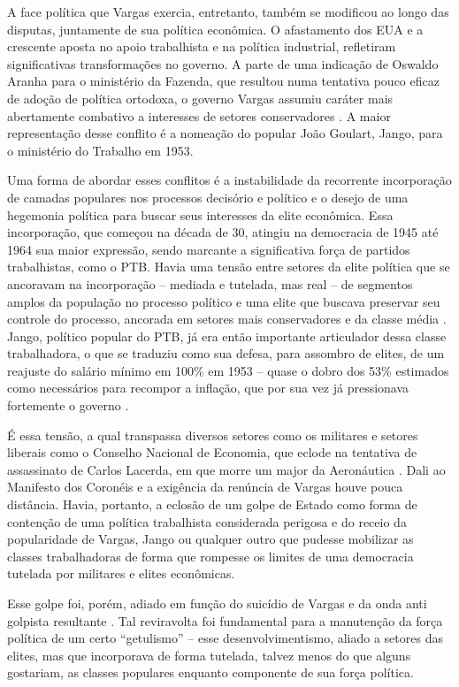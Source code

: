 A face política que Vargas exercia, entretanto, também se modificou ao
longo das disputas, juntamente de sua política econômica. O afastamento
dos EUA e a crescente aposta no apoio trabalhista e na política
industrial, refletiram significativas transformações no governo. A parte
de uma indicação de Oswaldo Aranha para o ministério da Fazenda, que
resultou numa tentativa pouco eficaz de adoção de política ortodoxa, o
governo Vargas assumiu caráter mais abertamente combativo a interesses
de setores conservadores \citep{vianna_o_2025}. A maior representação desse conflito é a
nomeação do popular João Goulart, Jango, para o ministério do Trabalho
em 1953.

Uma forma de abordar esses conflitos é a instabilidade da recorrente
incorporação de camadas populares nos processos decisório e político e o
desejo de uma hegemonia política para buscar seus interesses da elite
econômica. Essa incorporação, que começou na década de 30, atingiu na
democracia de 1945 até 1964 sua maior expressão, sendo marcante a
significativa força de partidos trabalhistas, como o PTB. Havia uma tensão entre
setores da elite política que se ancoravam na incorporação -- mediada e
tutelada, mas real -- de segmentos amplos da população no processo
político e uma elite que buscava preservar seu controle do processo,
ancorada em setores mais conservadores e da classe média \citep[]{weffortPopulismoNaPolitica2003}.
Jango, político popular do PTB, já era então importante articulador dessa
classe trabalhadora, o que se traduziu como sua defesa, para assombro de
elites, de um reajuste do salário mínimo em 100\% em 1953 -- quase o
dobro dos 53\% estimados como necessários para recompor a inflação, que
por sua vez já pressionava fortemente o governo \citep{vianna_o_2025}.

É essa tensão, a qual transpassa diversos setores como os militares e
setores liberais como o Conselho Nacional de Economia, que eclode na
tentativa de assassinato de Carlos Lacerda, em que morre um major da
Aeronáutica \citep{vianna_o_2025}. Dali ao Manifesto dos Coronéis e a
exigência da renúncia de Vargas houve pouca distância. Havia, portanto, a
eclosão de um golpe de Estado como forma de contenção
de uma política trabalhista considerada perigosa e do receio da
popularidade de Vargas, Jango ou qualquer outro que pudesse mobilizar as
classes trabalhadoras de forma que rompesse os limites de uma democracia
tutelada por militares e elites econômicas.

Esse golpe foi, porém, adiado em função do suicídio de Vargas e da onda
anti golpista resultante \citep{vianna_o_2025}. Tal reviravolta foi
fundamental para a manutenção da força política de um certo
``getulismo'' -- esse desenvolvimentismo, aliado a setores das elites, mas
que incorporava de forma tutelada, talvez menos do que alguns gostariam,
as classes populares enquanto componente de sua força política.

